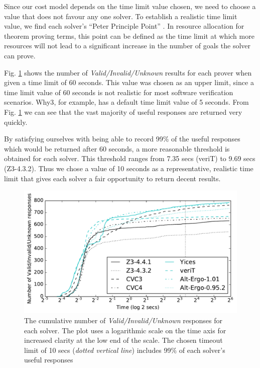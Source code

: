 \documentclass[submission,copyright,creativecommons]{eptcs}
\begin{document}
Since our cost model depends on the time limit value chosen, we need to choose a value that does not favour any one solver.  To establish a realistic time limit value, we find each solver's ``Peter Principle Point'' \cite{Sutcliffe200139}. In resource allocation for theorem proving terms, this point can be defined as the time limit at which more resources will not lead to a significant increase in the number of goals the solver can prove. 

Fig. \ref{fig:line-graph} shows the number of \textit{Valid/Invalid/Unknown} results for each prover when given a time limit of 60 seconds. 
This value was chosen as an upper limit, since a time limit value of 60 seconds is not realistic for most software verification scenarios.  \textsf{Why3}, for example, has a default time limit value of 5 seconds. 
From Fig. \ref{fig:line-graph} we can see that the vast majority of useful responses are returned very quickly. 

By satisfying ourselves with being able to record 99\% of the useful responses which would be returned after 60 seconds, a more reasonable threshold is obtained for each solver. This threshold ranges from 7.35 secs (veriT) to 9.69 secs (Z3-4.3.2). Thus we chose a value of 10 seconds as a representative, realistic time limit that gives each solver a fair opportunity to return decent results.     

\begin{figure}
\centering
\includegraphics[width=0.7\linewidth]{line-graph}
\caption{The cumulative number of \textit{Valid/Invalid/Unknown} responses for each solver. The plot uses a logarithmic scale on the time axis for increased clarity at the low end of the scale. The chosen timeout limit of 10 secs (\textit{dotted vertical line}) includes 99\% of each solver's useful responses}
\label{fig:line-graph}
\end{figure}
\end{document}
